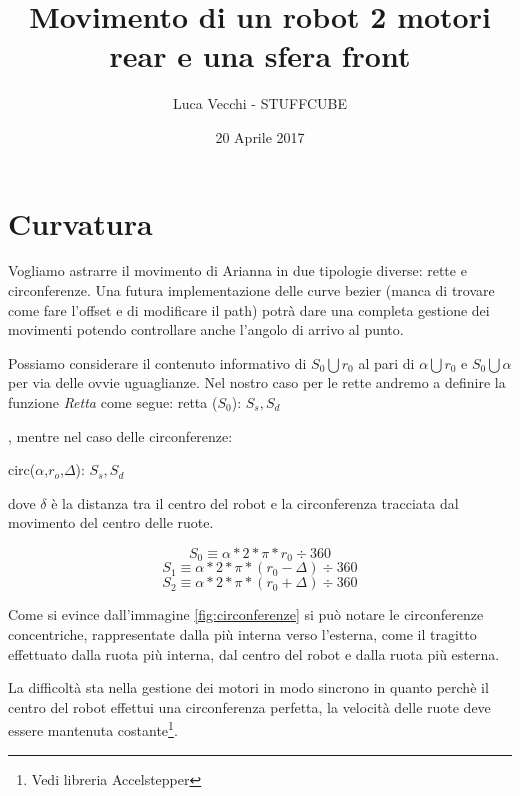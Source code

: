 \documentclass[12pt,oneside,a4paper]{article}
\title{Movimento di un robot 2 motori rear e una sfera front}
\author{Luca Vecchi - STUFFCUBE}
\date{20 Aprile 2017}
\begin{document}
	

	\maketitle
	\clearpage



	
	\section{Curvatura}
	
	Vogliamo astrarre il movimento di Arianna in due tipologie diverse: rette e circonferenze. Una futura implementazione delle curve bezier (manca di trovare come fare l'offset e di modificare il path) potrà dare una completa gestione dei movimenti potendo controllare anche l'angolo di arrivo al punto.
	
	Possiamo considerare il contenuto informativo di $S_0 \bigcup r_0$ al pari di $\alpha \bigcup r_0$ e $S_0 \bigcup \alpha$ per via delle ovvie uguaglianze.
	Nel nostro caso per le rette andremo a definire la funzione \textit{Retta} come segue:
	retta ($S_0$): $S_s , S_d$
	
	, mentre nel caso delle circonferenze:
	
	circ($\alpha$,$r_o$,$\Delta$):  $S_s , S_d$
	
	dove $\delta$ è la distanza tra il centro del robot e la circonferenza tracciata dal movimento del centro delle ruote.
	
	\begin{equation*}
	S_0 \equiv \alpha * 2 * \pi * r_0 \div 360
	\end{equation*}
	\begin{equation*}
	S_1 \equiv \alpha * 2 * \pi * (r_0 - \Delta) \div 360
	\end{equation*}	
	\begin{equation*}
	S_2 \equiv \alpha * 2 * \pi * (r_0 + \Delta) \div 360
	\end{equation*}
	
	Come si evince dall'immagine \ref{fig:circonferenze} si può notare le circonferenze concentriche, rappresentate dalla più interna verso l'esterna, come il tragitto effettuato dalla ruota più interna, dal centro del robot e dalla ruota più esterna.
	
	La difficoltà sta nella gestione dei motori in modo sincrono in quanto perchè il centro del robot effettui una circonferenza perfetta, la velocità delle ruote deve essere mantenuta costante\footnote{Vedi libreria Accelstepper}.
	
	
	\clearpage


\end{document}
